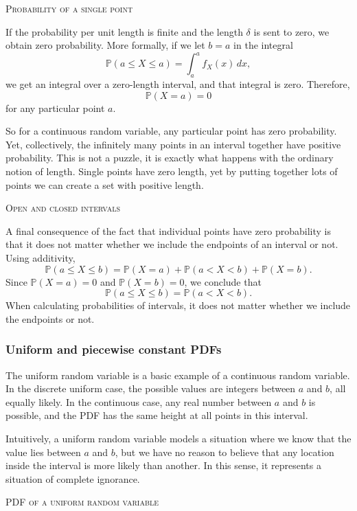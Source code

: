 \bigskip\textsc{Probability of a single point}

If the probability per unit length is finite and the length \(\delta\) is sent to zero, we obtain zero probability.  
More formally, if we let \(b = a\) in the integral
\[
\mathbb{P}(a \le X \le a) = \int_a^a f_X(x) \, dx,
\]
we get an integral over a zero-length interval, and that integral is zero.  
Therefore,
\[
\mathbb{P}(X = a) = 0
\]
for any particular point \(a\).

So for a continuous random variable, any particular point has zero probability.  
Yet, collectively, the infinitely many points in an interval together have positive probability.  
This is not a puzzle, it is exactly what happens with the ordinary notion of length.  
Single points have zero length, yet by putting together lots of points we can create a set with positive length.

\bigskip\textsc{Open and closed intervals}

A final consequence of the fact that individual points have zero probability is that it does not matter whether we include the endpoints of an interval or not.  
Using additivity,
\[
\mathbb{P}(a \le X \le b) = \mathbb{P}(X = a) + \mathbb{P}(a < X < b) + \mathbb{P}(X = b).
\]
Since \(\mathbb{P}(X = a) = 0\) and \(\mathbb{P}(X = b) = 0\), we conclude that
\[
\mathbb{P}(a \le X \le b) = \mathbb{P}(a < X < b).
\]
When calculating probabilities of intervals, it does not matter whether we include the endpoints or not.


\subsubsection{Uniform and piecewise constant PDFs}

The uniform random variable is a basic example of a continuous random variable.  
In the discrete uniform case, the possible values are integers between \(a\) and \(b\), all equally likely.  
In the continuous case, any real number between \(a\) and \(b\) is possible, and the PDF has the same height at all points in this interval.

Intuitively, a uniform random variable models a situation where we know that the value lies between \(a\) and \(b\), but we have no reason to believe that any location inside the interval is more likely than another.  
In this sense, it represents a situation of complete ignorance.

\bigskip\textsc{PDF of a uniform random variable}

